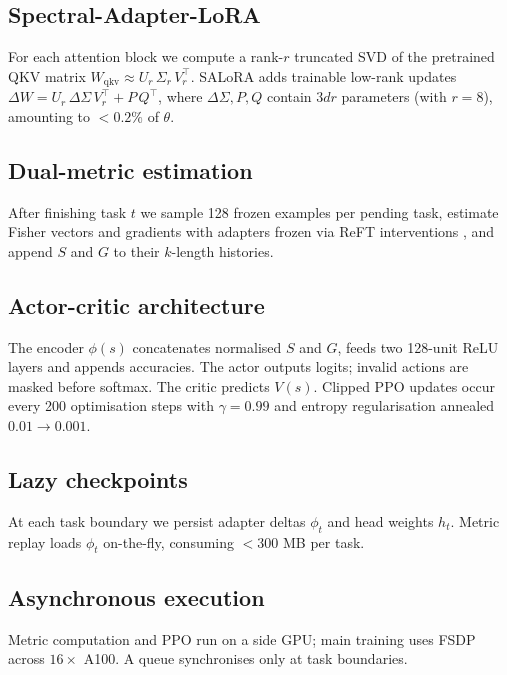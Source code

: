 \documentclass{article}
\begin{document}
\subsection{Spectral-Adapter-LoRA}
For each attention block we compute a rank-$r$ truncated SVD of the pretrained QKV matrix $W_{\mathrm{qkv}} \approx U_r\,\Sigma_r\,V_r^{\top}$. SALoRA adds trainable low-rank updates $\Delta W = U_r\,\Delta\Sigma\,V_r^{\top} + P\,Q^{\top}$, where $\Delta\Sigma, P, Q$ contain $3 d r$ parameters (with $r=8$), amounting to $< 0.2 \%$ of $\theta$.

\subsection{Dual-metric estimation}
After finishing task $t$ we sample 128 frozen examples per pending task, estimate Fisher vectors and gradients with adapters frozen via ReFT interventions \cite{wu-2024-reft}, and append $S$ and $G$ to their $k$-length histories.

\subsection{Actor-critic architecture}
The encoder $\phi(s)$ concatenates normalised $S$ and $G$, feeds two 128-unit ReLU layers and appends accuracies. The actor outputs logits; invalid actions are masked before softmax. The critic predicts $V(s)$. Clipped PPO updates occur every 200 optimisation steps with $\gamma = 0.99$ and entropy regularisation annealed $0.01 \rightarrow 0.001$.

\subsection{Lazy checkpoints}
At each task boundary we persist adapter deltas $\phi_t$ and head weights $h_t$. Metric replay loads $\phi_t$ on-the-fly, consuming $< 300$ MB per task.

\subsection{Asynchronous execution}
Metric computation and PPO run on a side GPU; main training uses FSDP across $16 \times$ A100. A queue synchronises only at task boundaries.
\end{document}
